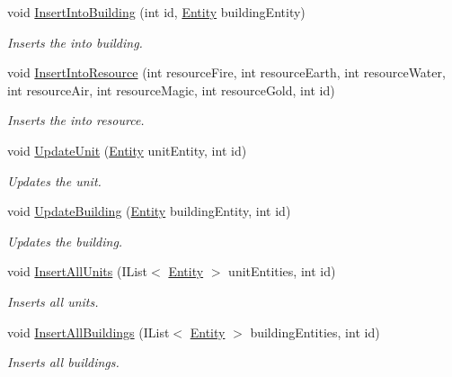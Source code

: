 \begin{DoxyCompactItemize}
void \hyperlink{classServer_1_1DB_1_1DBHandle_a8fbc59cc6602d140482f68f3477e4baf}{Insert\+Into\+Building} (int id, \hyperlink{classCore_1_1Models_1_1Entity}{Entity} building\+Entity)
\begin{DoxyCompactList}\small\item\em Inserts the into building. \end{DoxyCompactList}\item 
void \hyperlink{classServer_1_1DB_1_1DBHandle_a4c6a3c7f64dcd9c6b8719623cfff27d5}{Insert\+Into\+Resource} (int resource\+Fire, int resource\+Earth, int resource\+Water, int resource\+Air, int resource\+Magic, int resource\+Gold, int id)
\begin{DoxyCompactList}\small\item\em Inserts the into resource. \end{DoxyCompactList}\item 
void \hyperlink{classServer_1_1DB_1_1DBHandle_af9bdbff3aeab46d1632f447f99989557}{Update\+Unit} (\hyperlink{classCore_1_1Models_1_1Entity}{Entity} unit\+Entity, int id)
\begin{DoxyCompactList}\small\item\em Updates the unit. \end{DoxyCompactList}\item 
void \hyperlink{classServer_1_1DB_1_1DBHandle_aa32ad499307c7d70ff263c9136126aac}{Update\+Building} (\hyperlink{classCore_1_1Models_1_1Entity}{Entity} building\+Entity, int id)
\begin{DoxyCompactList}\small\item\em Updates the building. \end{DoxyCompactList}\item 
void \hyperlink{classServer_1_1DB_1_1DBHandle_a26f501161ac93754de2d55d4c8e916a5}{Insert\+All\+Units} (I\+List$<$ \hyperlink{classCore_1_1Models_1_1Entity}{Entity} $>$ unit\+Entities, int id)
\begin{DoxyCompactList}\small\item\em Inserts all units. \end{DoxyCompactList}\item 
void \hyperlink{classServer_1_1DB_1_1DBHandle_ae83c0555faf710ef98542284e7cd5748}{Insert\+All\+Buildings} (I\+List$<$ \hyperlink{classCore_1_1Models_1_1Entity}{Entity} $>$ building\+Entities, int id)
\begin{DoxyCompactList}\small\item\em Inserts all buildings. \end{DoxyCompactList}\item 

\end{DoxyCompactItemize}
